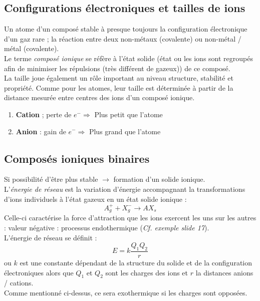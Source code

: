 \documentclass[12pt, a4paper]{article}
\begin{document}
\subsection{Configurations électroniques et tailles de ions}
Un atome d'un composé stable à presque toujours la configuration électronique d'un gaz rare ; la réaction entre deux non-métaux (covalente) ou non-métal / métal (covalente).\\

Le terme \textit{composé ionique} se réfère à l'état solide (état ou les ions sont regroupés afin de minimiser les répulsions (très différent de gazeux)) de ce composé.\\

La taille joue également un rôle important au niveau structure, stabilité et propriété. Comme pour les atomes, leur taille est déterminée à partir de la distance mesurée entre centres des ions d'un composé ionique.

\begin{enumerate}
\item \textbf{Cation} ; perte de $e^- \Rightarrow$ Plus petit que l'atome
\item \textbf{Anion} : gain de $e^- \Rightarrow$ Plus grand que l'atome
\end{enumerate}

\subsection{Composés ioniques binaires}
Si possibilité d'être plus stable $\rightarrow$ formation d'un solide ionique.\\
L'\textit{énergie de réseau} est la variation d'énergie accompagnant la transformations d'ions individuels à l'état gazeux en un état solide ionique : 
$$A^+_g + X^-_g \rightarrow AX_s$$
Celle-ci caractérise la force d'attraction que les ions exercent les uns sur les autres : valeur négative : processus endothermique (\textit{Cf. exemple slide 17}).\\
L'énergie de réseau se définit : 
$$E = k \frac{Q_1 Q_2}{r}$$
ou $k$ est une constante dépendant de la structure du solide et de la configuration électroniques alors que $Q_1$ et $Q_2$ sont les charges des ions et $r$ la distances anions / cations.\\
Comme mentionné ci-dessus, ce sera exothermique si les charges sont opposées.
\end{document}

